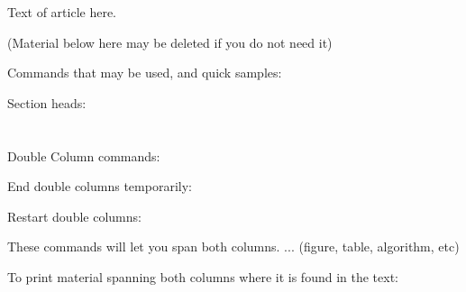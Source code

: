 \keywords{ }


\begin{article}

Text of article here.





\endnotes

\begin{references}
\end{references}

\bio{}

\end{article}


(Material below here may be deleted if you do not need it)

Commands that may be used, and quick samples:

Section heads:
\section{}
\subsection{}
\subsubsection{}
\paragraph{}


Double Column commands:

\goodbreak %

End double columns temporarily:
\endtwocolumns

Restart double columns: 
\twocolumns

These commands will let you span both columns.
\spanbothcolumns
   ... (figure, table, algorithm, etc)
\endspanbothcolumns

To print material spanning both columns where it is found in the text:

